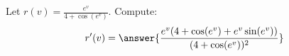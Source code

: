 \documentclass{ximera}
\begin{document}
\begin{exercise}
	Let $r(v) = \frac{e^v}{4+\cos(e^v)}$. Compute:
	\[ r'(v) =\answer{ \frac{e^v(4+\cos(e^v) + e^v \sin(e^v))}{(4+\cos(e^v))^2}  } \]
\end{exercise}
\end{document}
